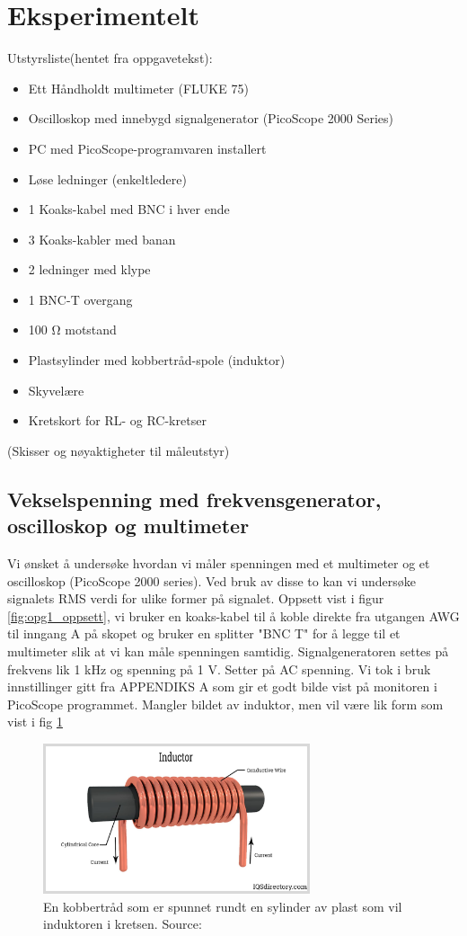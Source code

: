 \documentclass[norsk,a4paper,12pt]{article}
\begin{document}
\section{Eksperimentelt}
Utstyrsliste(hentet fra oppgavetekst):
\begin{itemize} 
\item Ett Håndholdt multimeter (FLUKE 75)  \item Oscilloskop med innebygd signalgenerator (PicoScope 2000 Series) \item PC med PicoScope-programvaren installert \item Løse ledninger (enkeltledere) \item 1 Koaks-kabel med BNC i hver ende \item 3 Koaks-kabler med banan \item 2 ledninger med klype \item 1 BNC-T overgang \item 100 Ω motstand \item Plastsylinder med kobbertråd-spole (induktor) \item Skyvelære \item Kretskort for RL- og RC-kretser 
\end{itemize}

(Skisser og nøyaktigheter til måleutstyr)
\subsection{Vekselspenning med frekvensgenerator, oscilloskop og multimeter }
Vi ønsket å undersøke hvordan vi måler spenningen med et multimeter og et oscilloskop (PicoScope
2000 series). Ved bruk av disse to kan vi undersøke signalets RMS verdi for ulike former på signalet. Oppsett vist i figur \ref{fig:opg1_oppsett}, vi bruker en koaks-kabel til å koble direkte fra utgangen
AWG til inngang A på skopet og bruker en splitter "BNC T" for å legge til et multimeter slik at vi kan måle spenningen samtidig. Signalgeneratoren settes på frekvens lik 1 kHz og spenning på 1 V. Setter på AC spenning. Vi tok i bruk innstillinger gitt fra APPENDIKS A som gir et godt bilde vist på monitoren i PicoScope programmet. Mangler bildet av induktor, men vil være lik form som vist i fig \ref{fig: spole} \\


\begin{figure}[htbp]
    \centering
    \includegraphics[width=0.7\textwidth]{Figs/inductor.jpg}
    \caption{En kobbertråd som er spunnet rundt en sylinder av plast som vil induktoren i kretsen. Source: \cite{InductorCoils2023}}
    \label{fig: spole}
\end{figure}
\end{document}
